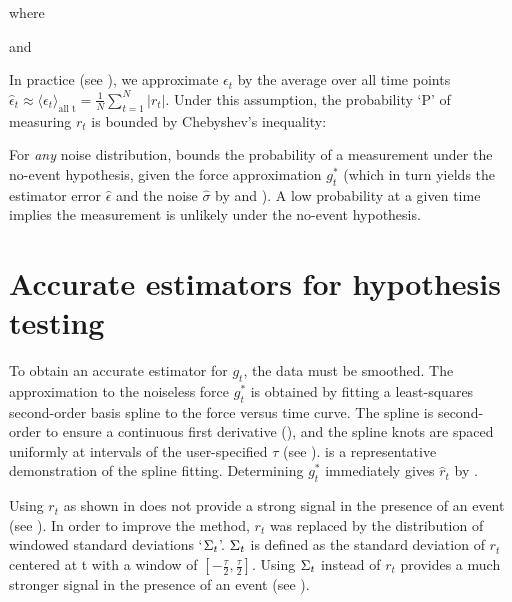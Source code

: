 
where


and 


In practice (see ), we approximate $\epsilon_t$ by the average over all time points $\hat{\epsilon}_t \approx \langle \epsilon_t \rangle_{\text{all t}} = \frac{1}{N} \sum_{t=1}^N |r_t|$. Under this assumption, the probability `P' of measuring $r_t$ is bounded by Chebyshev's inequality:



For \emph{any} noise distribution,  bounds the probability of a measurement under the no-event hypothesis, given the force approximation $g^{*}_t$ (which in turn yields the estimator error $\hat{\epsilon}$ and the noise $\hat{\sigma}$ by  and ). A low probability at a given time implies the measurement is unlikely under the no-event hypothesis. 

\section{Accurate estimators for hypothesis testing}

To obtain an accurate estimator for $g_t$, the data must be smoothed. The approximation to the noiseless force $g^{*}_t$ is obtained by fitting a least-squares second-order basis spline to the force versus time curve. The spline is second-order to ensure a continuous first derivative (), and the spline knots are spaced uniformly at intervals of  the user-specified $\tau$ (see ).  is a representative demonstration of the spline fitting. Determining  $g^{*}_t$ immediately gives $\hat{r}_t$ by  .

Using $r_t$ as shown in  does not provide a strong signal in the presence of an event (see ). In order to improve the method, $r_t$ was replaced by the distribution of windowed standard deviations `$\Sigma_t$'. $\Sigma_t$ is defined as the standard deviation of $r_t$ centered at t with a window of $[-\frac{\tau}{2},\frac{\tau}{2}]$. Using $\Sigma_t$ instead of $r_t$ provides a much stronger signal in the presence of an event (see ).  

